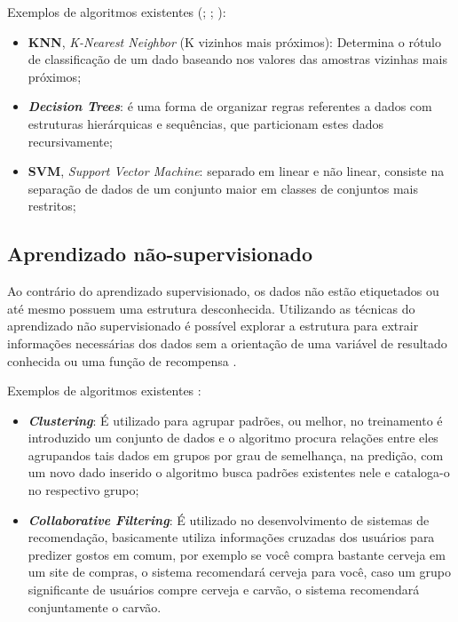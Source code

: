 Exemplos de algoritmos existentes (\cite{kirk2014thoughtful}; \cite{murthy1998automatic}; \cite{lorena2007introduccao}):
\begin{itemize}
    \item \textbf{KNN},\textit{ K-Nearest Neighbor} (K vizinhos mais próximos): Determina o rótulo de classificação de um dado baseando nos valores das amostras vizinhas mais próximos;
    \item \textit{\textbf{Decision Trees}}: é uma forma de organizar regras referentes a dados com estruturas hierárquicas e sequências, que particionam estes dados recursivamente;
    \item \textbf{SVM},\textit{ Support Vector Machine}: separado em linear e não linear, consiste na separação de dados de um conjunto maior em classes de conjuntos mais restritos;
\end{itemize}

\subsection{Aprendizado não-supervisionado}
Ao contrário do aprendizado supervisionado, os dados não estão etiquetados ou até mesmo possuem uma estrutura desconhecida. Utilizando as técnicas do aprendizado não supervisionado é possível explorar a estrutura para extrair informações necessárias dos dados sem a orientação de uma variável de resultado conhecida ou uma função de recompensa \cite{geron2017hands}.

Exemplos de algoritmos existentes \cite{kirk2014thoughtful}:
\begin{itemize}
    \item  \textbf{\textit{Clustering}}: É utilizado para agrupar padrões, ou melhor, no treinamento é introduzido um conjunto de dados e o algoritmo procura relações entre eles agrupandos tais dados em grupos por grau de semelhança, na predição, com um novo dado inserido o algoritmo busca padrões existentes nele e cataloga-o no respectivo grupo;   
    \item  \textbf{\textit{Collaborative Filtering}}: É utilizado no desenvolvimento de sistemas de recomendação, basicamente utiliza informações cruzadas dos usuários para predizer gostos em comum, por exemplo se você compra bastante cerveja em um site de compras, o sistema recomendará cerveja para você, caso um grupo significante de usuários compre cerveja e carvão, o sistema recomendará conjuntamente o carvão.
\end{itemize}

